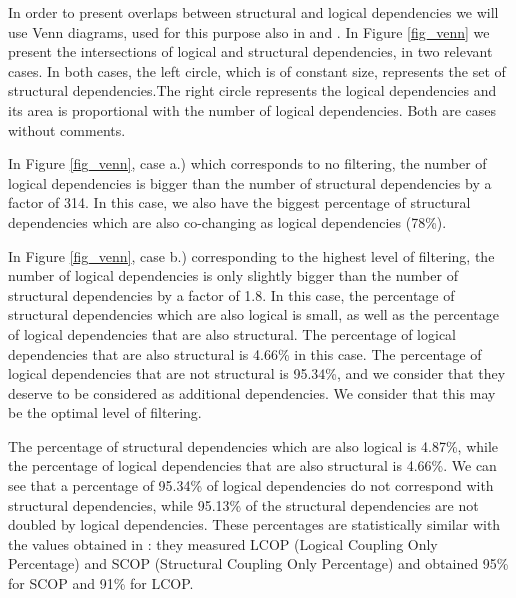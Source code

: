 \documentclass[a4paper,twoside]{article}
\begin{document}
In order to present overlaps between structural and logical dependencies we will use Venn diagrams, used for this purpose also in \cite{Oliva:2011:ISL:2067853.2068086} and \cite{DBLP:journals/jss/AjienkaC17}. In Figure \ref{fig_venn} we present the intersections of logical and structural dependencies, in two relevant cases. In both cases, the left circle, which is of constant size, represents the set of structural dependencies.The right circle represents the logical dependencies and its area is proportional with the number of logical dependencies. Both are cases without comments.

In Figure \ref{fig_venn}, case a.) which corresponds to no filtering, the number of logical dependencies is bigger than the number of structural dependencies by a factor of 314. In this case, we also have the biggest percentage of structural dependencies which are also co-changing as logical dependencies (78\%). %

In Figure \ref{fig_venn}, case b.) corresponding to the highest level of filtering, the number of logical dependencies is only slightly bigger than the number of structural dependencies by a factor of 1.8. In this case, the percentage of structural dependencies which are also logical is small, as well as the percentage of logical dependencies that are also structural.  The percentage of logical dependencies that are also structural is 4.66\% in this case. The percentage of logical dependencies that are not structural is 95.34\%, and we consider that they deserve to be considered as additional dependencies.
We consider that this may be the optimal level of filtering. 

The percentage of structural dependencies which are also logical is 4.87\%,  while the percentage of logical dependencies that are also structural is 4.66\%. We can see that a percentage of 95.34\% of logical dependencies do not correspond with structural dependencies, while 95.13\% of the structural dependencies are not doubled by logical dependencies. These percentages are statistically similar with the values obtained in \cite{Oliva:2011:ISL:2067853.2068086}: they measured LCOP (Logical Coupling Only Percentage)  and SCOP (Structural Coupling Only Percentage) and obtained 95\% for SCOP and 91\% for LCOP. 
\end{document}
